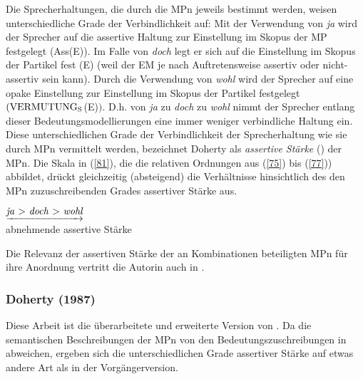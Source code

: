 Die Sprecherhaltungen, die durch die MPn jeweils bestimmt werden, weisen unterschiedliche Grade der Verbindlichkeit auf: Mit der Verwendung von \textit{ja} wird der Sprecher auf die assertive Haltung zur Einstellung im Skopus der MP festgelegt (Ass(E)). Im Falle von \textit{doch} legt er sich auf die Einstellung im Skopus der Partikel fest (E) (weil der EM je nach Auftretensweise assertiv oder nicht-assertiv sein kann). Durch die Verwendung von \textit{wohl} wird der Sprecher auf eine opake Einstellung zur Einstellung im Skopus der Partikel festgelegt $(\textrm{VERMU\-TUNG}_{\textrm{S}}$(\textrm{E})$)$. D.h. von \textit{ja} zu \textit{doch} zu \textit{wohl} nimmt der Sprecher entlang dieser Bedeutungsmodellierungen eine immer weniger verbindliche Haltung ein. Diese unterschiedlichen Grade der Verbindlichkeit der Sprecherhaltung wie sie durch MPn vermittelt werden, bezeichnet Doherty als \textit{assertive Stärke}  (\citeyear[83]{Doherty1985}) der MPn. Die Skala in (\ref{81}), die die relativen Ordnungen aus (\ref{75}) bis (\ref{77})) abbildet, drückt gleichzeitig (absteigend) die Verhältnisse hinsichtlich des den MPn zuzu\-schreibenden Grades assertiver Stärke aus.

\begin{exe}
	\ex\label{82} 
	$\underrightarrow{\text{\textit{ja} > \textit{doch} > \textit{wohl}}}$\\
	abnehmende assertive Stärke
\end{exe}	
Die Relevanz der assertiven Stärke der an Kombinationen beteiligten MPn für ihre Anordnung vertritt die Autorin auch in \citet{Doherty1987}.

\subsubsection{Doherty (1987)}
Diese Arbeit ist die überarbeitete und erweiterte Version von \citet{Doherty1985}. Da die semantischen Beschreibungen der MPn von den Bedeutungszuschreibungen in \citet{Doherty1985} abweichen, ergeben sich die unterschiedlichen Grade assertiver Stärke auf etwas andere Art als in der Vorgängerversion.\\

